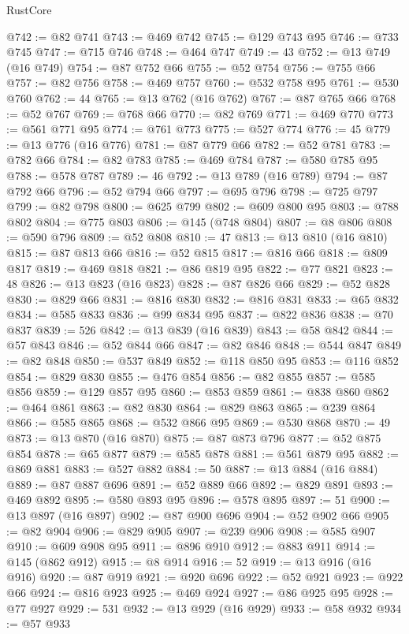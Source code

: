 \begin{lexlean}{RustCore}
\begin{coremodule}
@742 := @82 @741
@743 := @469 @742
@745 := @129 @743 @95
@746 := @733 @745
@747 := @715 @746
@748 := @464 @747
@749 := 43
@752 := @13 @749 (@16 @749)
@754 := @87 @752 @66
@755 := @52 @754
@756 := @755 @66
@757 := @82 @756
@758 := @469 @757
@760 := @532 @758 @95
@761 := @530 @760
@762 := 44
@765 := @13 @762 (@16 @762)
@767 := @87 @765 @66
@768 := @52 @767
@769 := @768 @66
@770 := @82 @769
@771 := @469 @770
@773 := @561 @771 @95
@774 := @761 @773
@775 := @527 @774
@776 := 45
@779 := @13 @776 (@16 @776)
@781 := @87 @779 @66
@782 := @52 @781
@783 := @782 @66
@784 := @82 @783
@785 := @469 @784
@787 := @580 @785 @95
@788 := @578 @787
@789 := 46
@792 := @13 @789 (@16 @789)
@794 := @87 @792 @66
@796 := @52 @794 @66
@797 := @695 @796
@798 := @725 @797
@799 := @82 @798
@800 := @625 @799
@802 := @609 @800 @95
@803 := @788 @802
@804 := @775 @803
@806 := @145 (@748 @804)
@807 := @8 @806
@808 := @590 @796
@809 := @52 @808
@810 := 47
@813 := @13 @810 (@16 @810)
@815 := @87 @813 @66
@816 := @52 @815
@817 := @816 @66
@818 := @809 @817
@819 := @469 @818
@821 := @86 @819 @95
@822 := @77 @821
@823 := 48
@826 := @13 @823 (@16 @823)
@828 := @87 @826 @66
@829 := @52 @828
@830 := @829 @66
@831 := @816 @830
@832 := @816 @831
@833 := @65 @832
@834 := @585 @833
@836 := @99 @834 @95
@837 := @822 @836
@838 := @70 @837
@839 := 526
@842 := @13 @839 (@16 @839)
@843 := @58 @842
@844 := @57 @843
@846 := @52 @844 @66
@847 := @82 @846
@848 := @544 @847
@849 := @82 @848
@850 := @537 @849
@852 := @118 @850 @95
@853 := @116 @852
@854 := @829 @830
@855 := @476 @854
@856 := @82 @855
@857 := @585 @856
@859 := @129 @857 @95
@860 := @853 @859
@861 := @838 @860
@862 := @464 @861
@863 := @82 @830
@864 := @829 @863
@865 := @239 @864
@866 := @585 @865
@868 := @532 @866 @95
@869 := @530 @868
@870 := 49
@873 := @13 @870 (@16 @870)
@875 := @87 @873 @796
@877 := @52 @875 @854
@878 := @65 @877
@879 := @585 @878
@881 := @561 @879 @95
@882 := @869 @881
@883 := @527 @882
@884 := 50
@887 := @13 @884 (@16 @884)
@889 := @87 @887 @696
@891 := @52 @889 @66
@892 := @829 @891
@893 := @469 @892
@895 := @580 @893 @95
@896 := @578 @895
@897 := 51
@900 := @13 @897 (@16 @897)
@902 := @87 @900 @696
@904 := @52 @902 @66
@905 := @82 @904
@906 := @829 @905
@907 := @239 @906
@908 := @585 @907
@910 := @609 @908 @95
@911 := @896 @910
@912 := @883 @911
@914 := @145 (@862 @912)
@915 := @8 @914
@916 := 52
@919 := @13 @916 (@16 @916)
@920 := @87 @919
@921 := @920 @696
@922 := @52 @921
@923 := @922 @66
@924 := @816 @923
@925 := @469 @924
@927 := @86 @925 @95
@928 := @77 @927
@929 := 531
@932 := @13 @929 (@16 @929)
@933 := @58 @932
@934 := @57 @933

\end{coremodule}
\end{lexlean}
